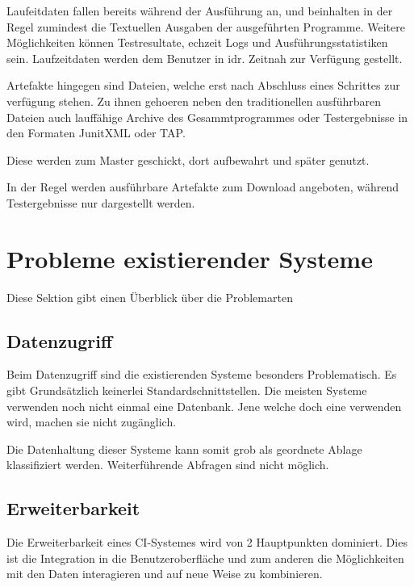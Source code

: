 Laufeitdaten fallen bereits w\"ahrend der Ausf\"uhrung an,
und beinhalten in der Regel zumindest die Textuellen Ausgaben
der ausgef\"uhrten Programme.
Weitere M\"oglichkeiten k\"onnen Testresultate, echzeit Logs und Ausf\"uhrungsstatistiken sein.
Laufzeitdaten werden dem Benutzer in idr. Zeitnah zur Verf\"ugung gestellt.

Artefakte hingegen sind Dateien,
welche erst nach Abschluss eines Schrittes zur verf\"ugung stehen.
Zu ihnen gehoeren neben den traditionellen ausf\"uhrbaren Dateien
auch lauff\"ahige Archive des Gesammtprogrammes oder Testergebnisse in den Formaten JunitXML oder TAP.


Diese werden zum Master geschickt, dort aufbewahrt und sp\"ater genutzt.

In der Regel werden ausf\"uhrbare Artefakte zum Download angeboten,
w\"ahrend Testergebnisse nur dargestellt werden.





\section{Probleme existierender Systeme}

Diese Sektion gibt einen \"Uberblick \"uber die Problemarten

\subsection{Datenzugriff}

Beim Datenzugriff sind die existierenden Systeme besonders Problematisch.
Es gibt Grunds\"atzlich keinerlei Standardschnittstellen.
Die meisten Systeme verwenden noch nicht einmal eine Datenbank.
Jene welche doch eine verwenden wird, machen sie nicht zug\"anglich.

Die Datenhaltung dieser Systeme kann somit grob als geordnete Ablage klassifiziert werden. Weiterf\"uhrende Abfragen sind nicht m\"oglich.

\subsection{Erweiterbarkeit}

Die Erweiterbarkeit eines CI-Systemes wird von 2 Hauptpunkten dominiert.
Dies ist die Integration in die Benutzeroberfl\"ache
und zum anderen die M\"oglichkeiten mit den Daten interagieren
und auf neue Weise zu kombinieren.

